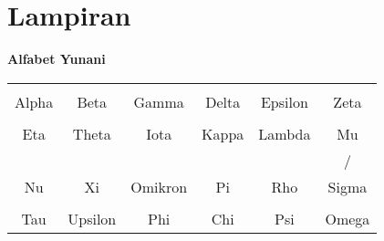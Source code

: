 \documentclass[12pt, a4paper]{article}\usepackage[utf8]{inputenc}
\theoremstyle{plain}
\theoremstyle{plain}
\numberwithin{equation}{section}
\theoremstyle{definition}
\begin{document}
	\section{Lampiran}
	
	\begin{center}
		\textbf{Alfabet Yunani}
	\end{center}
	
	\begin{table}[!h]
		\centering
		
		\begin{tabular}{cccccc}
			
			
			{\LARGErr \textAlpha   \textalpha} \qquad \qquad &  {\LARGErr \textBeta   \textbeta} \qquad \qquad &   {\LARGErr\textGamma   \textgamma} \qquad \qquad &   {\LARGErr\textDelta   \textdelta} \qquad \qquad &   {\LARGErr\textEpsilon   \textepsilon} \qquad \qquad  &   {\LARGErr \textZeta   \textzeta}  \\
			Alpha \qquad \qquad & Beta \qquad \qquad & Gamma \qquad \qquad & Delta \qquad \qquad & Epsilon \qquad \qquad & Zeta \\[2em]
			{\LARGErr \textEta   \texteta} \qquad \qquad &  {\LARGErr \textTheta   \texttheta} \qquad \qquad &  {\LARGErr \textIota   \textiota} \qquad \qquad &  {\LARGErr \textKappa   \textkappa} \qquad \qquad &  {\LARGErr \textLambda   \textlambda} \qquad \qquad &   {\LARGErr \textMu   \textmu}  \\
			Eta \qquad \qquad & Theta \qquad \qquad & Iota \qquad \qquad & Kappa \qquad \qquad & Lambda \qquad \qquad & Mu \\[2em]
			{\LARGErr \textNu   \textnu} \qquad \qquad &  {\LARGErr \textXi   \textxi} \qquad \qquad &  {\LARGErr \textOmikron   \textomikron} \qquad \qquad &  {\LARGErr \textPi   \textpi} \qquad \qquad &  {\LARGErr \textRho   \textrho} \qquad \qquad &  {\LARGErr \textSigma  \textsigma/\textvarsigma}  \\
			Nu \qquad \qquad & Xi \qquad \qquad & Omikron \qquad \qquad & Pi \qquad \qquad & Rho \qquad \qquad & Sigma \\[2em]
			{\LARGErr\textTau   \texttau } \qquad \qquad &  {\LARGErr \textupsilon   \textUpsilon} \qquad \qquad &  {\LARGErr \textPhi   \textphi} \qquad \qquad &  {\LARGErr \textChi   \textchi} \qquad \qquad &  {\LARGErr \textPsi   \textpsi} \qquad \qquad & {\LARGErr \textOmega  \textomega}  \\
			Tau \qquad \qquad & Upsilon \qquad \qquad & Phi \qquad \qquad & Chi \qquad \qquad & Psi \qquad \qquad & Omega 
			
		\end{tabular}
		
	\end{table}
	
\end{document}
